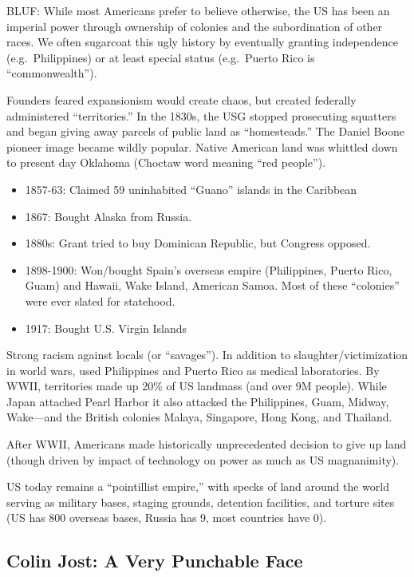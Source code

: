 \documentclass[
]{article}
\begin{document}
BLUF: While most Americans prefer to believe otherwise, the US has been
an imperial power through ownership of colonies and the subordination of
other races. We often sugarcoat this ugly history by eventually granting
independence (e.g.~Philippines) or at least special status (e.g.~Puerto
Rico is ``commonwealth'').

Founders feared expansionism would create chaos, but created federally
administered ``territories.'' In the 1830s, the USG stopped prosecuting
squatters and began giving away parcels of public land as
``homesteads.'' The Daniel Boone pioneer image became wildly popular.
Native American land was whittled down to present day Oklahoma (Choctaw
word meaning ``red people'').

\begin{itemize}
\item
  1857-63: Claimed 59 uninhabited ``Guano'' islands in the Caribbean
\item
  1867: Bought Alaska from Russia.
\item
  1880s: Grant tried to buy Dominican Republic, but Congress opposed.
\item
  1898-1900: Won/bought Spain's overseas empire (Philippines, Puerto
  Rico, Guam) and Hawaii, Wake Island, American Samoa. Most of these
  ``colonies'' were ever slated for statehood.
\item
  1917: Bought U.S. Virgin Islands
\end{itemize}

Strong racism against locals (or ``savages''). In addition to
slaughter/victimization in world wars, used Philippines and Puerto Rico
as medical laboratories. By WWII, territories made up 20\% of US
landmass (and over 9M people). While Japan attached Pearl Harbor it also
attacked the Philippines, Guam, Midway, Wake---and the British colonies
Malaya, Singapore, Hong Kong, and Thailand.

After WWII, Americans made historically unprecedented decision to give
up land (though driven by impact of technology on power as much as US
magnanimity).

US today remains a ``pointillist empire,'' with specks of land around
the world serving as military bases, staging grounds, detention
facilities, and torture sites (US has 800 overseas bases, Russia has 9,
most countries have 0).

\hypertarget{colin-jost-a-very-punchable-face}{%
\subsection{Colin Jost: A Very Punchable
Face}\label{colin-jost-a-very-punchable-face}}
\end{document}
